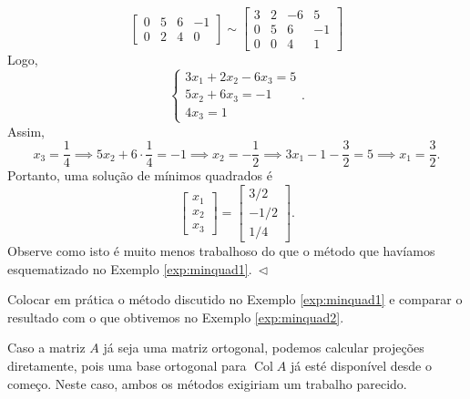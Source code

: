 \documentclass[../livro.tex]{subfiles}  %
\begin{document}
\begin{example}
\begin{equation}
\begin{bmatrix}
    0 & 5 &  6 & -1 \\
    0 & 2 &  4 & 0
  \end{bmatrix} \sim
  \begin{bmatrix}
    3 & 2 & -6 & 5 \\
    0 & 5 &  6 & -1 \\
    0 & 0 &  4 & 1
  \end{bmatrix}
  \end{equation} Logo,
  \begin{equation}
  \left\{
    \begin{array}{ll}
      3 x_1 + 2 x_2 - 6 x_3 = 5 \\
      5x_2 + 6 x_3 = -1 \\
      4x_3 = 1
    \end{array}
  \right..
  \end{equation} Assim,
  \begin{equation}
  x_3 = \frac{1}{4} \implies 5x_2 + 6 \cdot \frac{1}{4} = -1 \implies x_2 = -\frac{1}{2} \implies 3 x_1 - 1 - \frac{3}{2}  = 5 \implies x_1 = \frac{3}{2}.
  \end{equation} Portanto, uma solução de mínimos quadrados é
  \begin{equation}
  \begin{bmatrix}
    x_1 \\ x_2 \\ x_3
  \end{bmatrix} =
  \begin{bmatrix}
    3/2 \\ -1/2 \\ 1/4
  \end{bmatrix}.
  \end{equation} Observe como isto é muito menos trabalhoso do que o método que havíamos esquematizado no Exemplo \ref{exp:minquad1}$. \ \lhd$
\end{example}

\begin{exercise}
  Colocar em prática o método discutido no Exemplo \ref{exp:minquad1} e comparar o resultado com o que obtivemos no Exemplo \ref{exp:minquad2}.
\end{exercise}

\begin{remark}
  Caso a matriz $A$ já seja uma matriz ortogonal, podemos calcular projeções diretamente, pois uma base ortogonal para $\operatorname{Col} A$ já esté disponível desde o começo. Neste caso, ambos os métodos exigiriam um trabalho parecido.
\end{remark}
\end{document}
